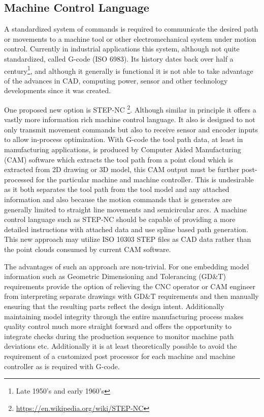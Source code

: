 \documentclass{article}
\begin{document}
\subsection{Machine Control Language} \label{machinecontrol}
A standardized system of commands is required to communicate the desired path or movements to a machine tool or other electromechanical system under motion control. Currently in industrial applications this system, although not quite standardized, called G-code (ISO 6983). Its history dates back over half a century\footnote{Late 1950's and early 1960's}, and although it generally is functional it is not able to take advantage of the advances in CAD, computing power, sensor and other technology developments since it was created. 
\par 
One proposed new option is STEP-NC \footnote{\url{https://en.wikipedia.org/wiki/STEP-NC}}. Although similar in principle it offers a vastly more information rich machine control language. It also is designed to not only transmit movement commands but also to receive sensor and encoder inputs to allow in-process optimization. With G-code the tool path data, at least in manufacturing applications, is produced by Computer Aided Manufacturing (CAM) software which extracts the tool path from a point cloud which is extracted from 2D drawing or 3D model, this CAM output must be further post-processed for the particular machine and machine controller. This is undesirable as it both separates the tool path from the tool model and any attached information and also because the motion commands that is generates are generally limited to straight line movements and semicircular arcs. A machine control language such as STEP-NC should be capable of providing a more detailed instructions with attached data and use spline based path generation. This new approach may utilize ISO 10303 STEP files as CAD data rather than the point clouds consumed by current CAM software. 
\par 
The advantages of such an approach are non-trivial. For one embedding model information such as Geometric Dimensioning and Tolerancing (GD\&T) requirements provide the option of relieving the CNC operator or CAM engineer from interpreting separate drawings with GD\&T requirements and then manually ensuring that the resulting parts reflect the design intent. Additionally maintaining model integrity through the entire manufacturing process makes quality control much more straight forward and offers the opportunity to integrate checks during the production sequence to monitor machine path deviations etc. Additionally it is at least theoretically possible to avoid the requirement of a customized post processor for each machine and machine controller as is required with G-code. 
\end{document}
